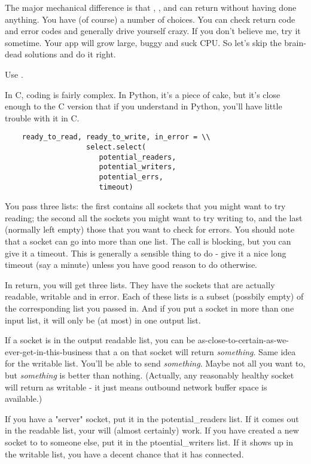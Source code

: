 \documentclass{howto}
\begin{document}
The major mechanical difference is that ,
,  and  can
return without having done anything. You have (of course) a number of
choices. You can check return code and error codes and generally drive
yourself crazy. If you don't believe me, try it sometime. Your app
will grow large, buggy and suck CPU. So let's skip the brain-dead
solutions and do it right.

Use .

In C, coding  is fairly complex. In Python, it's a
piece of cake, but it's close enough to the C version that if you
understand  in Python, you'll have little trouble
with it in C.

\begin{verbatim}    ready_to_read, ready_to_write, in_error = \\
                   select.select(
                      potential_readers, 
                      potential_writers, 
                      potential_errs, 
                      timeout)
\end{verbatim}

You pass  three lists: the first contains all
sockets that you might want to try reading; the second all the sockets
you might want to try writing to, and the last (normally left empty)
those that you want to check for errors.  You should note that a
socket can go into more than one list. The  call is
blocking, but you can give it a timeout. This is generally a sensible
thing to do - give it a nice long timeout (say a minute) unless you
have good reason to do otherwise.

In return, you will get three lists. They have the sockets that are
actually readable, writable and in error. Each of these lists is a
subset (possbily empty) of the corresponding list you passed in. And
if you put a socket in more than one input list, it will only be (at
most) in one output list.

If a socket is in the output readable list, you can be
as-close-to-certain-as-we-ever-get-in-this-business that a
 on that socket will return \emph{something}. Same
idea for the writable list. You'll be able to send
\emph{something}. Maybe not all you want to, but \emph{something} is
better than nothing. (Actually, any reasonably healthy socket will
return as writable - it just means outbound network buffer space is
available.)

If you have a "server" socket, put it in the potential_readers
list. If it comes out in the readable list, your 
will (almost certainly) work. If you have created a new socket to
 to someone else, put it in the ptoential_writers
list. If it shows up in the writable list, you have a decent chance
that it has connected.
\end{document}
